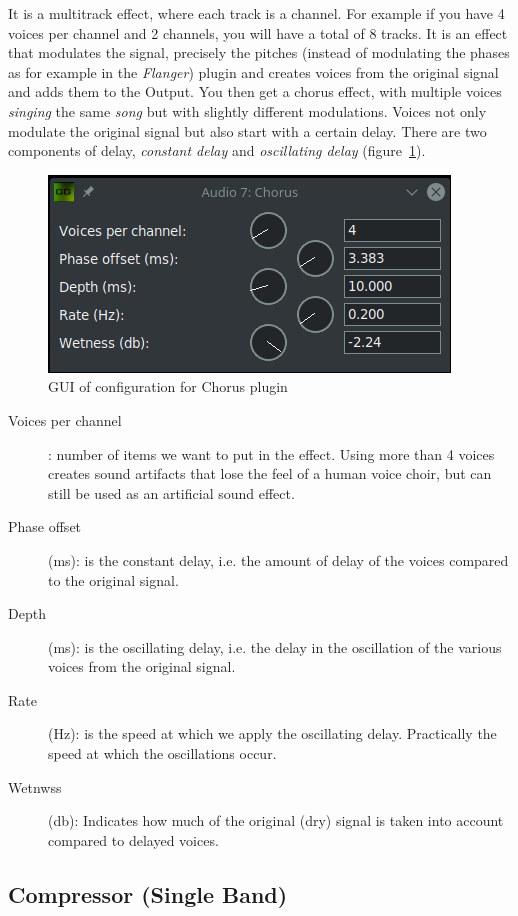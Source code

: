 It is a multitrack effect, where each track is a channel. For example if you have 4 voices per channel and 2 channels, you will have a total of 8 tracks.
It is an effect that modulates the signal, precisely the pitches (instead of modulating the phases as for example in the \textit{Flanger}) plugin and creates voices from the original signal and adds them to the Output. You then get a chorus effect, with multiple voices \textit{singing} the same \textit{song} but with slightly different modulations. Voices not only modulate the original signal but also start with a certain delay. There are two components of delay, \textit{constant delay} and \textit{oscillating delay} (figure~\ref{fig:chorus}).

\begin{figure}[htpb]
	\centering
	\includegraphics[width=0.5\linewidth]{images/chorus.png}
	\caption{GUI of configuration for Chorus plugin}
	\label{fig:chorus}
\end{figure}

\begin{description}
	\item[Voices per channel]: number of items we want to put in the effect. Using more than 4 voices creates sound artifacts that lose the feel of a human voice choir, but can still be used as an artificial sound effect.
	\item[Phase offset] (ms): is the constant delay, i.e. the amount of delay of the voices compared to the original signal.
	\item[Depth] (ms): is the oscillating delay, i.e. the delay in the oscillation of the various voices from the original signal.
	\item[Rate] (Hz): is the speed at which we apply the oscillating delay. Practically the speed at which the oscillations occur.
	\item[Wetnwss] (db): Indicates how much of the original (dry) signal is taken into account compared to delayed voices.
\end{description}

\subsection{Compressor (Single Band)}%
\label{sub:compressor}

